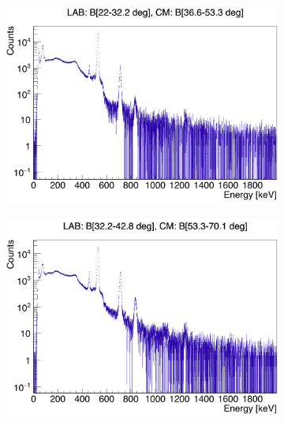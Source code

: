 \documentclass[twoside,english]{uiofysmaster/uiofysmaster}
\begin{document}
\begin{figure}[htb!]
	\centering
	\begin{subfigure}[t]{0.49\textwidth}
		\centering
		\includegraphics[width=\textwidth]{../Plots/plotting/Projections-combined/B_dcB_x-ProjY_2-4_combined}
		\caption{}
	\end{subfigure}
	\hfill
	\begin{subfigure}[t]{0.49\textwidth}
		\centering
		\includegraphics[width=\textwidth]{../Plots/plotting/Projections-combined/B_dcB_x-ProjY_5-8_combined}
		\caption{}
	\end{subfigure}
	\begin{subfigure}[t]{0.49\textwidth}
		\centering

\end{subfigure}
\end{figure}
\end{document}
